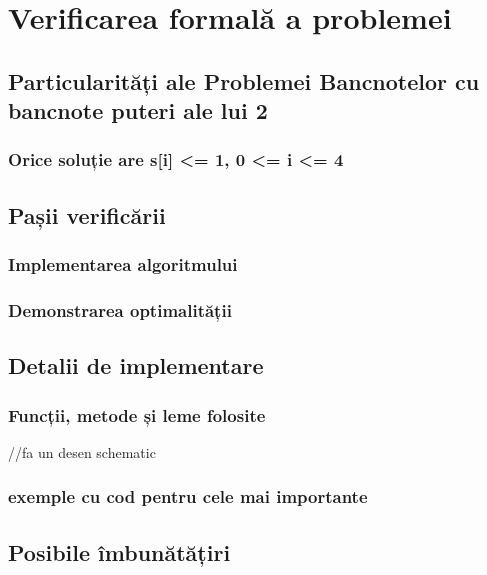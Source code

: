 \chapter{Verificarea formală a problemei}


\section{Particularități ale Problemei Bancnotelor cu bancnote puteri ale lui 2}
\subsection{Orice soluție are s[i] <= 1, 0 <= i <= 4}

\section{Pașii verificării}
\subsection{Implementarea algoritmului}
\subsection{Demonstrarea optimalității}

\section{Detalii de implementare}
\subsection{Funcții, metode și leme folosite}
//fa un desen schematic
\subsection{exemple cu cod pentru cele mai importante}

\section{Posibile îmbunătățiri}


